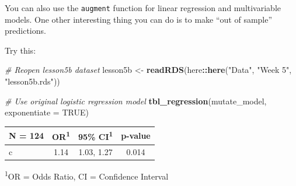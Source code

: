 \documentclass[]{book}
\newenvironment{Shaded}{\begin{snugshade}}{\end{snugshade}}
\newcommand{\CommentTok}[1]{\textcolor[rgb]{0.56,0.35,0.01}{\textit{#1}}}
\newcommand{\DataTypeTok}[1]{\textcolor[rgb]{0.13,0.29,0.53}{#1}}
\newcommand{\DecValTok}[1]{\textcolor[rgb]{0.00,0.00,0.81}{#1}}
\newcommand{\KeywordTok}[1]{\textcolor[rgb]{0.13,0.29,0.53}{\textbf{#1}}}
\newcommand{\NormalTok}[1]{#1}
\newcommand{\OperatorTok}[1]{\textcolor[rgb]{0.81,0.36,0.00}{\textbf{#1}}}
\newcommand{\OtherTok}[1]{\textcolor[rgb]{0.56,0.35,0.01}{#1}}
\newcommand{\StringTok}[1]{\textcolor[rgb]{0.31,0.60,0.02}{#1}}
\begin{document}
You can also use the \texttt{augment} function for linear regression and
multivariable models. One other interesting thing you can do is to make
``out of sample'' predictions.

Try this:

\begin{Shaded}
\begin{Highlighting}[]
\CommentTok{# Reopen lesson5b dataset}
\NormalTok{lesson5b <-}\StringTok{ }\KeywordTok{readRDS}\NormalTok{(here}\OperatorTok{::}\KeywordTok{here}\NormalTok{(}\StringTok{"Data"}\NormalTok{, }\StringTok{"Week 5"}\NormalTok{, }\StringTok{"lesson5b.rds"}\NormalTok{))}

\CommentTok{# Use original logistic regression model}
\KeywordTok{tbl_regression}\NormalTok{(mutate_model, }\DataTypeTok{exponentiate =} \OtherTok{TRUE}\NormalTok{)}
\end{Highlighting}
\end{Shaded}

\captionsetup[table]{labelformat=empty,skip=1pt}
\begin{longtable}{lccc}
\toprule
\textbf{N = 124} & \textbf{OR}\textsuperscript{1} & \textbf{95\% CI}\textsuperscript{1} & \textbf{p-value} \\ 
\midrule
c & 1.14 & 1.03, 1.27 & 0.014 \\ 
\bottomrule
\end{longtable}
\vspace{-5mm}
\begin{minipage}{\linewidth}
\textsuperscript{1}OR = Odds Ratio, CI = Confidence Interval \\ 
\end{minipage}

\begin{Shaded}
\end{Shaded}
\end{document}
